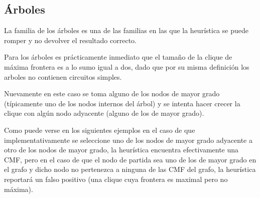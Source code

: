 \subsection{\'Arboles}
La familia de los \'arboles es una de las familias en las que la heur\'istica
se puede romper y no devolver el resultado correcto. 

Para los \'arboles es pr\'acticamente inmediato que el 
tama\~no de la clique de m\'axima frontera es a lo sumo igual a dos, dado
que por su misma definici\'on los arboles no contienen circuitos simples.

Nuevamente en este caso se toma alguno de los nodos de mayor grado 
(t\'ipicamente uno de los nodos internos del \'arbol) y se intenta hacer
crecer la clique con alg\'un nodo adyacente (alguno de los de mayor grado).

Como puede verse en los siguientes ejemplos en el caso de que 
implementativamente se seleccione uno de los nodos de mayor grado
adyacente a otro de los nodos de mayor grado, la heur\'istica encuentra
efectivamente una CMF, pero en el caso de que el nodo de partida sea 
uno de los de mayor grado en el grafo y dicho nodo no pertenezca a
ninguna de las CMF del grafo, la heur\'istica reportar\'a un falso 
positivo (una clique cuya frontera es maximal pero no m\'axima).

